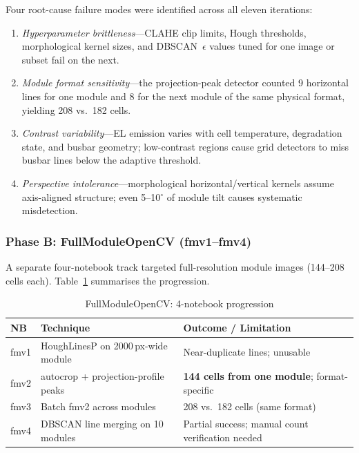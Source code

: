 \documentclass[conference]{IEEEtran}
\begin{document}
Four root-cause failure modes were identified across all
eleven iterations:
\begin{enumerate}
  \item \textit{Hyperparameter brittleness}---CLAHE clip
        limits, Hough thresholds, morphological kernel
        sizes, and DBSCAN~$\epsilon$ values tuned for one
        image or subset fail on the next.
  \item \textit{Module format sensitivity}---the
        projection-peak detector counted 9 horizontal lines
        for one module and 8 for the next module of the same
        physical format, yielding 208 vs.\ 182 cells.
  \item \textit{Contrast variability}---EL emission varies
        with cell temperature, degradation state, and busbar
        geometry; low-contrast regions cause grid detectors
        to miss busbar lines below the adaptive threshold.
  \item \textit{Perspective intolerance}---morphological
        horizontal/vertical kernels assume axis-aligned
        structure; even 5--10$^\circ$ of module tilt causes
        systematic misdetection.
\end{enumerate}

\subsubsection{Phase B: FullModuleOpenCV (fmv1--fmv4)}

A separate four-notebook track targeted full-resolution
module images (144--208 cells each). Table~\ref{tab:classical_full}
summarises the progression.

\begin{table}[t]
  \caption{FullModuleOpenCV: 4-notebook progression}
  \label{tab:classical_full}
  \begin{center}
  \renewcommand{\arraystretch}{1.05}
  \small
  \begin{tabular}{p{0.7cm}p{2.2cm}p{3.3cm}}
    \toprule
    \textbf{NB} & \textbf{Technique} &
    \textbf{Outcome / Limitation} \\
    \midrule
    fmv1 & HoughLinesP on 2000\,px-wide module &
           Near-duplicate lines; unusable \\
    fmv2 & autocrop + projection-profile peaks &
           \textbf{144 cells from one module}; format-specific \\
    fmv3 & Batch fmv2 across modules &
           208 vs.\ 182 cells (same format) \\
    fmv4 & DBSCAN line merging on 10 modules &
           Partial success; manual count verification needed \\
    \bottomrule
  \end{tabular}
  \end{center}
\end{table}
\end{document}
